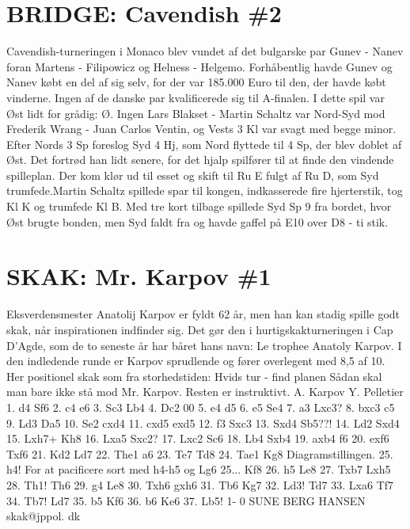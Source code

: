 \section{BRIDGE: Cavendish \#2}
\label{JPPOLHighstMatch2}
Cavendish-turneringen i Monaco blev vundet af det bulgarske par Gunev - Nanev foran Martens - Filipowicz og Helness - Helgemo. Forhåbentlig havde Gunev og Nanev købt en del af sig selv, for der var 185.000 Euro til den, der havde købt vinderne. Ingen af de danske par kvalificerede sig til A-finalen. I dette spil var Øst lidt for grådig: Ø. Ingen Lars Blakset - Martin Schaltz var Nord-Syd mod Frederik Wrang - Juan Carlos Ventin, og Vests 3 Kl var svagt med begge minor. Efter Nords 3 Sp foreslog Syd 4 Hj, som Nord flyttede til 4 Sp, der blev doblet af Øst. Det fortrød han lidt senere, for det hjalp spilfører til at finde den vindende spilleplan. Der kom klør ud til esset og skift til Ru E fulgt af Ru D, som Syd trumfede.Martin Schaltz spillede spar til kongen, indkasserede fire hjerterstik, tog Kl K og trumfede Kl B. Med tre kort tilbage spillede Syd Sp 9 fra bordet, hvor Øst brugte bonden, men Syd faldt fra og havde gaffel på E10 over D8 - ti stik.

\section{SKAK: Mr. Karpov \#1}
\label{JPPOLSencondHighestMatch1}
Eksverdensmester Anatolij Karpov er fyldt 62 år, men han kan stadig spille godt skak, når inspirationen indfinder sig. Det gør den i hurtigskakturneringen i Cap D'Agde, som de to seneste år har båret hans navn: Le trophee Anatoly Karpov. I den indledende runde er Karpov sprudlende og fører overlegent med 8,5 af 10. Her positionel skak som fra storhedstiden: Hvids tur - find planen Sådan skal man bare ikke stå mod Mr. Karpov. Resten er instruktivt. A. Karpov Y. Pelletier 1. d4 Sf6 2. c4 e6 3. Sc3 Lb4 4. Dc2 00 5. e4 d5 6. e5 Se4 7. a3 Lxc3? 8. bxc3 c5 9. Ld3 Da5 10. Se2 cxd4 11. cxd5 exd5 12. f3 Sxc3 13. Sxd4 Sb5??! 14. Ld2 Sxd4 15. Lxh7+ Kh8 16. Lxa5 Sxc2? 17. Lxc2 Sc6 18. Lb4 Sxb4 19. axb4 f6 20. exf6 Txf6 21. Kd2 Ld7 22. The1 a6 23. Te7 Td8 24. Tae1 Kg8 Diagramstillingen. 25. h4! For at pacificere sort med h4-h5 og Lg6 25... Kf8 26. h5 Le8 27. Txb7 Lxh5 28. Th1! Th6 29. g4 Le8 30. Txh6 gxh6 31. Tb6 Kg7 32. Ld3! Td7 33. Lxa6 Tf7 34. Tb7! Ld7 35. b5 Kf6 36. b6 Ke6 37. Lb5! 1- 0 SUNE BERG HANSEN skak@jppol. dk

